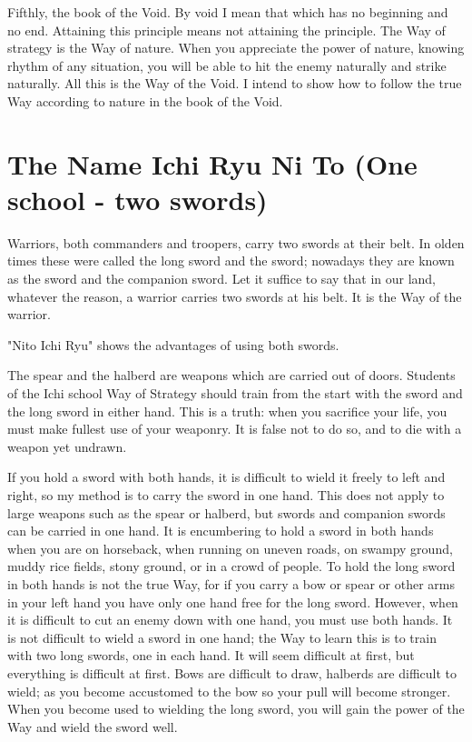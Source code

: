 \documentclass[12pt]{report}
\begin{document}
Fifthly, the book of the Void. By void I mean that which has no beginning and no end. Attaining this principle means not attaining the principle. The Way of strategy is the Way of nature. When you appreciate the power of nature, knowing rhythm of any situation, you will be able to hit the enemy naturally and strike naturally. All this is the Way of the Void. I intend to show how to follow the true Way according to nature in the book of the Void.
\section*{The Name Ichi Ryu Ni To (One school - two swords)}
Warriors, both commanders and troopers, carry two swords at their belt. In olden times these were called the long sword and the sword; nowadays they are known as the sword and the companion sword. Let it suffice to say that in our land, whatever the reason, a warrior carries two swords at his belt. It is the Way of the warrior.

"Nito Ichi Ryu" shows the advantages of using both swords.

The spear and the halberd are weapons which are carried out of doors. Students of the Ichi school Way of Strategy should train from the start with the sword and the long sword in either hand. This is a truth: when you sacrifice your life, you must make fullest use of your weaponry. It is false not to do so, and to die with a weapon yet undrawn.

If you hold a sword with both hands, it is difficult to wield it freely to left and right, so my method is to carry the sword in one hand. This does not apply to large weapons such as the spear or halberd, but swords and companion swords can be carried in one hand. It is encumbering to hold a sword in both hands when you are on horseback, when running on uneven roads, on swampy ground, muddy rice fields, stony ground, or in a crowd of people. To hold the long sword in both hands is not the true Way, for if you carry a bow or spear or other arms in your left hand you have only one hand free for the long sword. However, when it is difficult to cut an enemy down with one hand, you must use both hands. It is not difficult to wield a sword in one hand; the Way to learn this is to train with two long swords, one in each hand. It will seem difficult at first, but everything is difficult at first. Bows are difficult to draw, halberds are difficult to wield; as you become accustomed to the bow so your pull will become stronger. When you become used to wielding the long sword, you will gain the power of the Way and wield the sword well.
\end{document}
